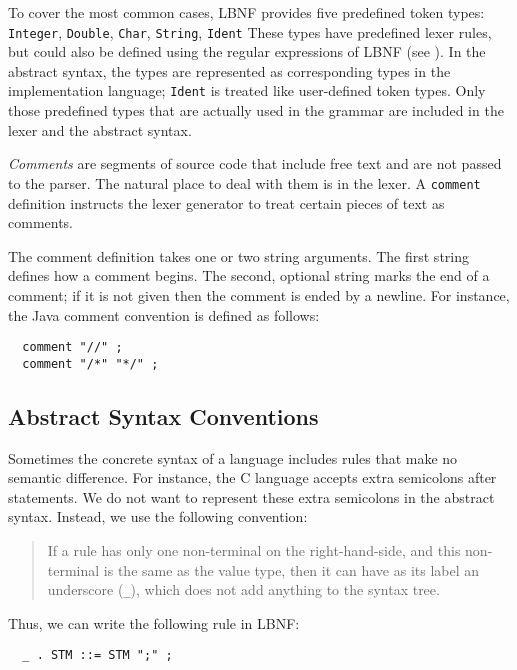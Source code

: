 
To cover the most common cases, LBNF provides
five predefined token types:
\bequ
{\tt Integer}, 
{\tt Double}, 
{\tt Char}, 
{\tt String}, 
{\tt Ident} 
\enqu
These types have predefined lexer rules, but could also be defined
using the regular expressions of LBNF (see \cite{bnfc}).
In the abstract syntax, the types are represented as corresponding
types in the implementation language; {\tt Ident} is treated like
user-defined token types.
Only those predefined types that are actually used in
the grammar are included in the lexer and the
abstract syntax. 


\textit{Comments} are segments of source code that include free
text and are not passed to the parser. The natural place
to deal with them is in the lexer. A {\tt comment} definition instructs the
lexer generator to treat certain pieces of text as comments. 

The comment definition takes one or two string arguments. The first
string defines how a comment begins.
The second, optional string marks the end of a comment;
if it is not given then the comment is ended by a newline.
For instance, the Java comment convention is defined as follows:
\begin{verbatim}
  comment "//" ;
  comment "/*" "*/" ; 
\end{verbatim}

\subsection{Abstract Syntax Conventions}

\label{conventions}


Sometimes the concrete syntax of a language includes rules that make
no semantic difference. For instance, the C language 
accepts extra semicolons after statements.
We do not want to represent these extra semicolons in the abstract syntax.
Instead, we use the following convention:
\begin{quote}
If a rule has only one non-terminal on the right-hand-side, and this
non-terminal is the same as the value type, then it can have as its label
an underscore ({\tt \_}), which 
does not add anything to the syntax tree.
\end{quote}
Thus, we can write the following rule in LBNF:
\begin{verbatim}
  _ . STM ::= STM ";" ;
\end{verbatim}



